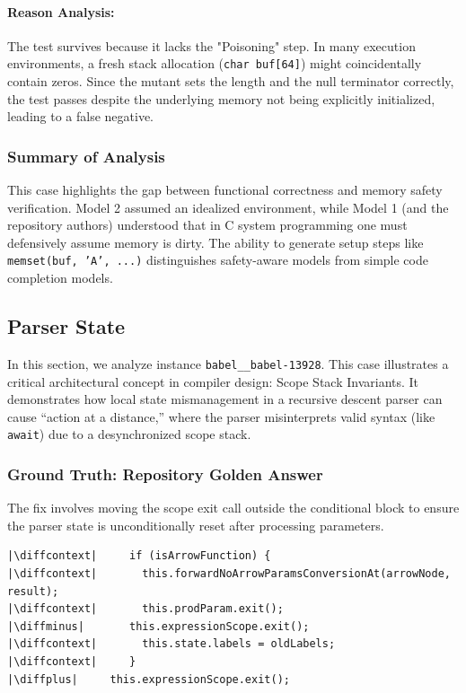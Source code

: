 \documentclass[11pt]{article}
\newcommand{\diffminus}{\textcolor{red}{-}}         %
\newcommand{\diffplus}{\textcolor{green!70!black}{+}} %
\newcommand{\diffcontext}{\phantom{+}}              %
\begin{document}
\paragraph{Reason Analysis:}
The test survives because it lacks the "Poisoning" step. In many execution environments, a fresh stack allocation (\texttt{char buf[64]}) might coincidentally contain zeros. Since the mutant sets the length and the null terminator correctly, the test passes despite the underlying memory not being explicitly initialized, leading to a false negative.

\subsubsection{Summary of Analysis}
This case highlights the gap between functional correctness and memory safety verification. Model 2 assumed an idealized environment, while Model 1 (and the repository authors) understood that in C system programming one must defensively assume memory is dirty. The ability to generate setup steps like \texttt{memset(buf, 'A', ...)} distinguishes safety-aware models from simple code completion models.

\subsection{Parser State}

In this section, we analyze instance \texttt{babel\_\_babel-13928}. This case illustrates a critical architectural concept in compiler design: Scope Stack Invariants. It demonstrates how local state mismanagement in a recursive descent parser can cause ``action at a distance,'' where the parser misinterprets valid syntax (like \texttt{await}) due to a desynchronized scope stack.

\subsubsection{Ground Truth: Repository Golden Answer}
The fix involves moving the scope exit call outside the conditional block to ensure the parser state is unconditionally reset after processing parameters.

\begin{verbatim}
|\diffcontext|     if (isArrowFunction) {
|\diffcontext|       this.forwardNoArrowParamsConversionAt(arrowNode, result);
|\diffcontext|       this.prodParam.exit();
|\diffminus|       this.expressionScope.exit();
|\diffcontext|       this.state.labels = oldLabels;
|\diffcontext|     }
|\diffplus|     this.expressionScope.exit();
\end{verbatim}
\end{document}
